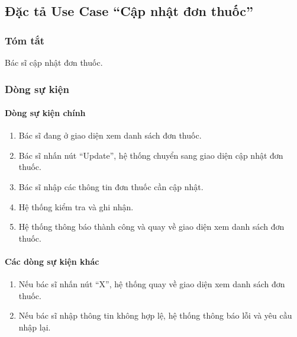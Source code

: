 \subsection{Đặc tả Use Case ``Cập nhật đơn thuốc''}

\subsubsection{Tóm tắt}
Bác sĩ cập nhật đơn thuốc.

\subsubsection{Dòng sự kiện}
\paragraph{\textbf{Dòng sự kiện chính}}
\begin{enumerate}
  \item Bác sĩ đang ở giao diện xem danh sách đơn thuốc.
  \item Bác sĩ nhấn nút ``Update'', hệ thống chuyển sang giao diện cập nhật đơn thuốc.
  \item Bác sĩ nhập các thông tin đơn thuốc cần cập nhật.
  \item Hệ thống kiểm tra và ghi nhận.
  \item Hệ thống thông báo thành công và quay về giao diện xem danh sách đơn thuốc.
\end{enumerate}

\paragraph{\textbf{Các dòng sự kiện khác}}
\begin{enumerate}
  \item Nếu bác sĩ nhấn nút ``X'', hệ thống quay về giao diện xem danh sách đơn thuốc.
  \item Nếu bác sĩ nhập thông tin không hợp lệ, hệ thống thông báo lỗi và yêu cầu nhập lại.
\end{enumerate}

